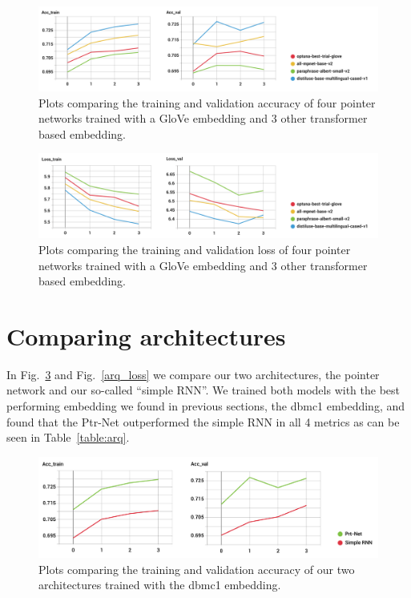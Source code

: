 \begin{figure}[!ht]
\centerline{\includegraphics[width=1.1\textwidth]{figuras/glove_vs_transformer_-ACC.png}   }
\caption{Plots comparing the training and validation accuracy of four pointer networks trained with a GloVe embedding and 3 other transformer based embedding.}
\label{glove_acc}
\end{figure}

\begin{figure}[!ht]
\centerline{\includegraphics[width=1.1\textwidth]{figuras/glove_vs_transformer_-Loss.png}} 
\caption{Plots comparing the training and validation loss of four pointer networks trained with a GloVe embedding and 3 other transformer based embedding.}
\label{glove_loss}
\end{figure}


\newpage

\section{Comparing architectures}

 
In Fig.~\ref{arq_acc} and Fig.~\ref{arq_loss} we compare our two architectures, the pointer network and our so-called ``simple RNN''. We trained both models with the best performing embedding we found in previous sections, the dbmc1 embedding, and found that the Ptr-Net outperformed the simple RNN in all 4 metrics as can be seen in Table~\ref{table:arq}. 


\begin{figure}[!ht]
\centerline{\includegraphics[width=1.1\textwidth]{figuras/arquiteturas_-ACC.png}   }
\caption{Plots comparing the training and validation accuracy of our two architectures trained with the  dbmc1 embedding.}
\label{arq_acc}
\end{figure}

